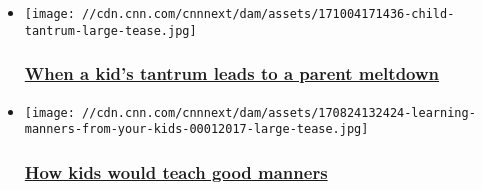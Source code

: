 \begin{itemize}
\item
  \href{/2017/10/04/health/tantrums-parenting-how-to-deal-with-them/index.html}{}

  \texttt{[image: //cdn.cnn.com/cnnnext/dam/assets/171004171436-child-tantrum-large-tease.jpg]}

  \hypertarget{when-a-kids-tantrum-leads-to-a-parent-meltdown}{%
  \subsubsection{\texorpdfstring{\href{/2017/10/04/health/tantrums-parenting-how-to-deal-with-them/index.html}{When
  a kid's tantrum leads to a parent
  meltdown}}{When a kid's tantrum leads to a parent meltdown}}\label{when-a-kids-tantrum-leads-to-a-parent-meltdown}}
\item
  \href{/2017/09/06/health/good-manners-teaching-kids-parenting/index.html}{}

  \texttt{[image: //cdn.cnn.com/cnnnext/dam/assets/170824132424-learning-manners-from-your-kids-00012017-large-tease.jpg]}

  \hypertarget{how-kids-would-teach-good-manners}{%
  \subsubsection{\texorpdfstring{\href{/2017/09/06/health/good-manners-teaching-kids-parenting/index.html}{How
  kids would teach good
  manners}}{How kids would teach good manners}}\label{how-kids-would-teach-good-manners}}
\end{itemize}

